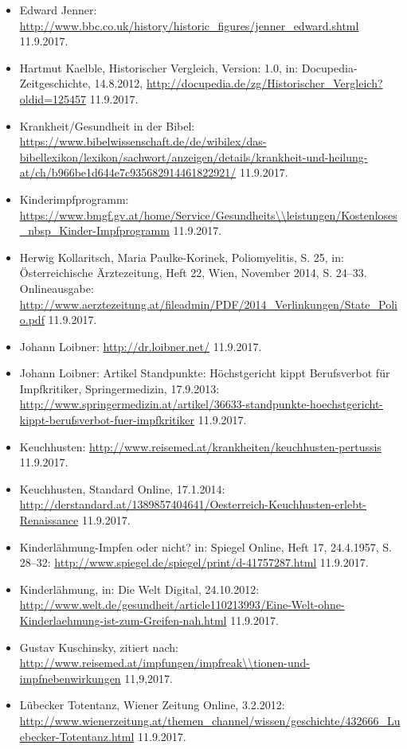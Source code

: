 \documentclass[
    a4paper,
    12pt,
    hyphens,
    chapterprefix=true,
    headheight=33pt,
    footheight=29pt,
    headings=optiontohead, %
]{scrartcl}
\begin{document}
{\begin{itemize}
\item{Edward Jenner: \url{http://www.bbc.co.uk/history/historic_figures/jenner_edward.shtml} 11.9.2017.}
\item{Hartmut Kaelble, Historischer Vergleich, Version: 1.0, in: Docupedia-Zeitgeschichte, 14.8.2012, \url{http://docupedia.de/zg/Historischer_Vergleich?oldid=125457} 11.9.2017.}
\item{Krankheit/Gesundheit in der Bibel: \url{https://www.bibelwissenschaft.de/de/wibilex/das-bibellexikon/lexikon/sachwort/anzeigen/details/krankheit-und-heilung-at/ch/b966be1d644e7c935682914461822921/} 11.9.2017.}
\item{Kinderimpfprogramm: \url{https://www.bmgf.gv.at/home/Service/Gesundheits\\leistungen/Kostenloses_nbsp_Kinder-Impfprogramm} 11.9.2017.}
\item{Herwig Kollaritsch, Maria Paulke-Korinek, Poliomyelitis, S. 25, in: Österreichische Ärztezeitung, Heft 22, Wien, November 2014, S. 24--33. Onlineausgabe: \url{http://www.aerztezeitung.at/fileadmin/PDF/2014_Verlinkungen/State_Polio.pdf} 11.9.2017.}
\item{Johann Loibner: \url{http://dr.loibner.net/} 11.9.2017.}
\item{Johann Loibner: Artikel Standpunkte: Höchstgericht kippt Berufsverbot für Impfkritiker, Springermedizin, 17.9.2013: \url{http://www.springermedizin.at/artikel/36633-standpunkte-hoechstgericht-kippt-berufsverbot-fuer-impfkritiker} 11.9.2017.}
\item{Keuchhusten: \url{http://www.reisemed.at/krankheiten/keuchhusten-pertussis} 11.9.2017.}
\item{Keuchhusten, Standard Online, 17.1.2014: \url{http://derstandard.at/1389857404641/Oesterreich-Keuchhusten-erlebt-Renaissance} 11.9.2017.}
\item{Kinderlähmung-Impfen oder nicht? in: Spiegel Online, Heft 17, 24.4.1957, S. 28--32: \url{http://www.spiegel.de/spiegel/print/d-41757287.html} 11.9.2017.}
\item{Kinderlähmung, in: Die Welt Digital, 24.10.2012: \url{http://www.welt.de/gesundheit/article110213993/Eine-Welt-ohne-Kinderlaehmung-ist-zum-Greifen-nah.html} 11.9.2017.}
\item{Gustav Kuschinsky, zitiert nach: \url{http://www.reisemed.at/impfungen/impfreak\\tionen-und-impfnebenwirkungen} 11,9,2017.}
\item{Lübecker Totentanz, Wiener Zeitung Online, 3.2.2012: \url{http://www.wienerzeitung.at/themen_channel/wissen/geschichte/432666_Luebecker-Totentanz.html} 11.9.2017.}

\end{itemize}}
\end{document}
